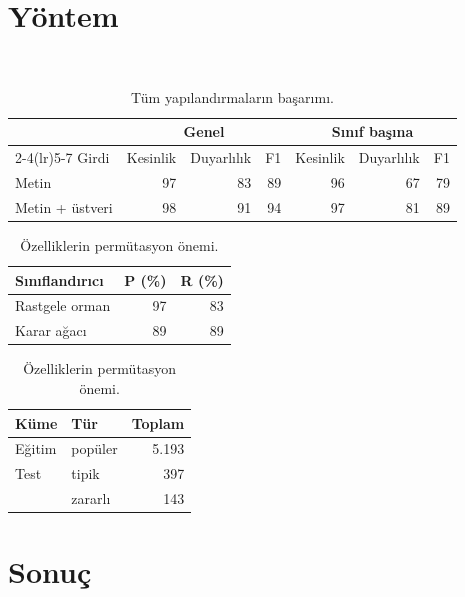 \documentclass[10pt,a4paper,twocolumn]{article}
\begin{document}
\section{Yöntem}
\paragrafB\ \paragrafC\ \paragrafA\ \paragrafB\ \paragrafC\ \paragrafA\ \paragrafB\ \paragrafC
\begin{table}[t]
\centering
\caption{Tüm yapılandırmaların başarımı.}
\begin{tabular}{lrrrrrr}
\toprule
& \multicolumn{3}{c}{Genel} & \multicolumn{3}{c}{Sınıf başına} \\
\cmidrule(lr){2-4}\cmidrule(lr){5-7}
Girdi & Kesinlik & Duyarlılık & F1 & Kesinlik & Duyarlılık & F1 \\
\midrule
Metin & 97 & 83 & 89 & 96 & 67 & 79 \\
Metin + üstveri & 98 & 91 & 94 & 97 & 81 & 89 \\
\bottomrule
\end{tabular}
\end{table}
\begin{table}[h]
\centering
\caption{Sınıflandırıcıların başarımı.}
\begin{tabular}{lrr}
\toprule
Sınıflandırıcı & P (\%) & R (\%) \\
\midrule
Rastgele orman & 97 & 83 \\
Karar ağacı & 89 & 89 \\
\bottomrule
\end{tabular}
\vspace{0.4em}
\caption{Eğitim ve test kümelerindeki başarım.}
\begin{tabular}{llr}
\toprule
Küme & Tür & Toplam \\
\midrule
Eğitim & popüler & 5.193 \\
\midrule
Test & tipik & 397 \\
 & zararlı & 143 \\
\end{tabular}
\vspace{1.4em}
\caption{Özelliklerin permütasyon önemi.}
\end{table}
\section{Sonuç}
\paragrafC\ \paragrafA\ \paragrafB\ \paragrafC\ \paragrafA\ \paragrafB\ \paragrafC\ \paragrafA
\end{document}
